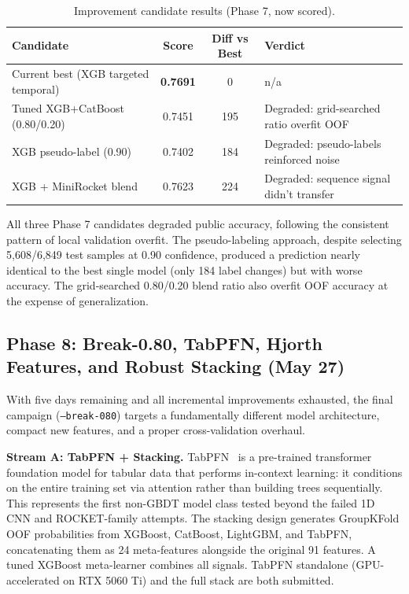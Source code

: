 \documentclass[12pt, a4paper]{article}
\begin{document}
\begin{table}[h]
\centering
\caption{Improvement candidate results (Phase 7, now scored).}
\label{tab:phase7}
\begin{tabularx}{\textwidth}{@{} Y c c Y @{}}
\toprule
\textbf{Candidate} & \textbf{Score} & \textbf{Diff vs Best} & \textbf{Verdict} \\ \midrule
Current best (XGB targeted temporal) & \textbf{0.7691} & 0 & n/a \\
Tuned XGB+CatBoost (0.80/0.20) & 0.7451 & 195 & Degraded: grid-searched ratio overfit OOF \\
XGB pseudo-label (0.90) & 0.7402 & 184 & Degraded: pseudo-labels reinforced noise \\
XGB + MiniRocket blend & 0.7623 & 224 & Degraded: sequence signal didn't transfer \\ \bottomrule
\end{tabularx}
\end{table}

All three Phase 7 candidates degraded public accuracy, following the consistent pattern of local validation overfit. The pseudo-labeling approach, despite selecting 5{,}608/6{,}849 test samples at 0.90 confidence, produced a prediction nearly identical to the best single model (only 184 label changes) but with worse accuracy. The grid-searched 0.80/0.20 blend ratio also overfit OOF accuracy at the expense of generalization.

\subsection{Phase 8: Break-0.80, TabPFN, Hjorth Features, and Robust Stacking (May 27)}

With five days remaining and all incremental improvements exhausted, the final campaign (\texttt{--break-080}) targets a fundamentally different model architecture, compact new features, and a proper cross-validation overhaul.

\textbf{Stream A: TabPFN + Stacking.} TabPFN~\cite{hollmann2023tabpfn} is a pre-trained transformer foundation model for tabular data that performs in-context learning: it conditions on the entire training set via attention rather than building trees sequentially. This represents the first non-GBDT model class tested beyond the failed 1D CNN and ROCKET-family attempts. The stacking design generates GroupKFold OOF probabilities from XGBoost, CatBoost, LightGBM, and TabPFN, concatenating them as 24 meta-features alongside the original 91 features. A tuned XGBoost meta-learner combines all signals. TabPFN standalone (GPU-accelerated on RTX 5060 Ti) and the full stack are both submitted.
\end{document}
